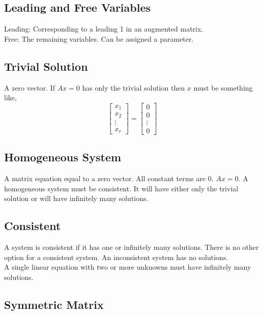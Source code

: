 \documentclass[12pt]{article}
\begin{document}
\subsection{Leading and Free Variables}

Leading: Corresponding to a leading 1 in an augmented matrix.\\
Free: The remaining variables. Can be assigned a parameter.


\subsection{Trivial Solution}

A zero vector. If $Ax = 0$ has only the trivial solution then $x$ must be something like,
$$
\begin{bmatrix}
    x_1\\
    x_2\\
    \vdots\\
    x_r
\end{bmatrix}
=
\begin{bmatrix}
    0\\
    0\\
    \vdots\\
    0
\end{bmatrix}
$$


\subsection{Homogeneous System}

A matrix equation equal to a zero vector. All constant terms are 0. $Ax = 0$. A homogeneous system must be consistent. It will have either only the trivial solution or will have infinitely many solutions.


\subsection{Consistent}

A system is consistent if it has one or infinitely many solutions. There is no other option for a consistent system. An inconsistent system has no solutions.\\
A single linear equation with two or more unknowns must have infinitely many solutions.


\subsection{Symmetric Matrix}
\end{document}
